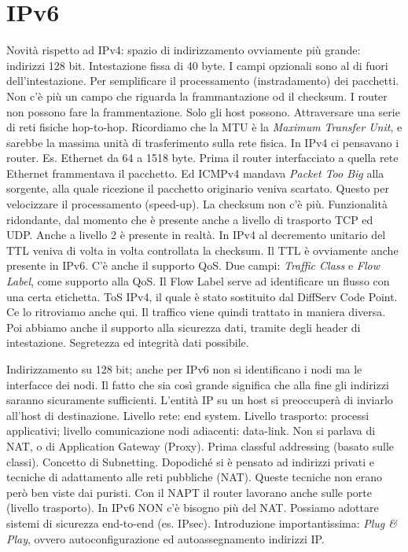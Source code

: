 \section{IPv6}

Novità rispetto ad IPv4: spazio di indirizzamento ovviamente più grande: indirizzi 128 bit. Intestazione fissa di 40 byte. I campi opzionali sono al di fuori dell'intestazione. Per semplificare il processamento (instradamento) dei pacchetti. Non c'è più un campo che riguarda la frammantazione od il checksum. I router non possono fare la frammentazione. Solo gli host possono. Attraversare una serie di reti fisiche hop-to-hop. Ricordiamo che la MTU è la \textit{Maximum Transfer Unit}, e sarebbe la massima unità di trasferimento sulla rete fisica. In IPv4 ci pensavano i router. Es. Ethernet da 64 a 1518 byte. Prima il router interfacciato a quella rete Ethernet frammentava il pacchetto. Ed ICMPv4 mandava \textit{Packet Too Big} alla sorgente, alla quale ricezione il pacchetto originario veniva scartato. Questo per velocizzare il processamento (speed-up). La checksum non c'è più. Funzionalità ridondante, dal momento che è presente anche a livello di trasporto TCP ed UDP. Anche a livello 2 è presente in realtà. In IPv4 al decremento unitario del TTL veniva di volta in volta controllata la checksum. Il TTL è ovviamente anche presente in IPv6. C'è anche il supporto QoS. Due campi: \textit{Traffic Class} e \textit{Flow Label}, come supporto alla QoS. Il Flow Label serve ad identificare un flusso con una certa etichetta. ToS IPv4, il quale è stato sostituito dal DiffServ Code Point. Ce lo ritroviamo anche qui. Il traffico viene quindi trattato in maniera diversa. Poi abbiamo anche il supporto alla sicurezza dati, tramite degli header di intestazione. Segretezza ed integrità dati possibile.

Indirizzamento su 128 bit; anche per IPv6 non si identificano i nodi ma le interfacce dei nodi. Il fatto che sia così grande significa che alla fine gli indirizzi saranno sicuramente sufficienti. L'entità IP su un host si preoccuperà di inviarlo all'host di destinazione. Livello rete: end system. Livello trasporto: processi applicativi; livello comunicazione nodi adiacenti: data-link. Non si parlava di NAT, o di Application Gateway (Proxy). Prima classful addressing (basato sulle classi). Concetto di Subnetting. Dopodiché si è pensato ad indirizzi privati e tecniche di adattamento alle reti pubbliche (NAT). Queste tecniche non erano però ben viste dai puristi. Con il NAPT il router lavorano anche sulle porte (livello trasporto). In IPv6 NON c'è bisogno più del NAT. Possiamo adottare sistemi di sicurezza end-to-end (es. IPsec). Introduzione importantissima: \textit{Plug \& Play}, ovvero autoconfigurazione ed autoassegnamento indirizzi IP.

